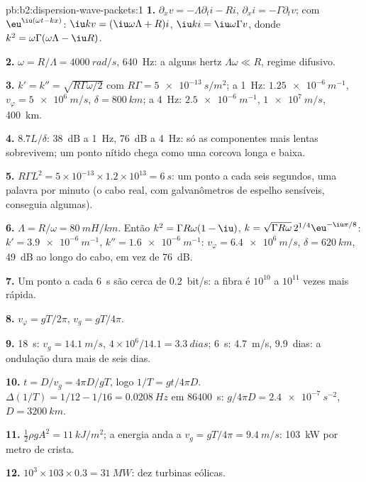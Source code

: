 \begin{solution}{pb:b2:dispersion-wave-packets:1}
\textbf{1.} $\partial_xv = -\Lambda\partial_ti - Ri$, $\partial_xi = -\Gamma\partial_tv$; com
$\eu^{\iu(\omega t - kx)}$: $\iu kv = (\iu\omega\Lambda + R)i$, $\iu ki = \iu\omega\Gamma v$, donde
$k^2 = \omega\Gamma(\omega\Lambda - \iu R)$.

\textbf{2.} $\omega = R/\Lambda = \qty{4000}{rad/s}$, \qty{640}{Hz}: a alguns hertz $\Lambda\omega
\ll R$, regime difusivo.

\textbf{3.} $k' = k'' = \sqrt{R\Gamma\omega/2}$ com $R\Gamma = \qty{5e-13}{s/m^2}$; a \qty{1}{Hz}:
$\qty{1.25e-6}{m^{-1}}$, $v_\varphi = \qty{5e6}{m/s}$, $\delta = \qty{800}{km}$; a \qty{4}{Hz}:
$\qty{2.5e-6}{m^{-1}}$, $\qty{1e7}{m/s}$, \qty{400}{km}.

\textbf{4.} $8.7L/\delta$: \qty{38}{dB} a \qty{1}{Hz}, \qty{76}{dB} a \qty{4}{Hz}: só as
componentes mais lentas sobrevivem; um ponto nítido chega como uma corcova longa e baixa.

\textbf{5.} $R\Gamma L^2 = 5 \times 10^{-13} \times 1.2 \times 10^{13} = \qty{6}{s}$: um ponto a cada
seis segundos, uma palavra por minuto (o cabo real, com galvanômetros
de espelho sensíveis, conseguia algumas).

\textbf{6.} $\Lambda = R/\omega = \qty{80}{mH/km}$. Então $k^2 = \Gamma R\omega(1 - \iu)$, $k = \sqrt{\Gamma R\omega}
\,2^{1/4}\eu^{-\iu\pi/8}$: $k' = \qty{3.9e-6}{m^{-1}}$, $k'' = \qty{1.6e-6}{m^{-1}}$: $v_\varphi =
\qty{6.4e6}{m/s}$, $\delta = \qty{620}{km}$, \qty{49}{dB} ao longo do cabo, em vez de
\qty{76}{dB}.

\textbf{7.} Um ponto a cada \qty{6}{s} são cerca de \qty{0.2}{bit/s}: a fibra é
$10^{10}$ a $10^{11}$ vezes mais rápida.

\textbf{8.} $v_\varphi = gT/2\pi$, $v_g = gT/4\pi$.

\textbf{9.} \qty{18}{s}: $v_g = \qty{14.1}{m/s}$, $4 \times 10^6/14.1 = \qty{3.3}{dias}$;
\qty{6}{s}: \qty{4.7}{m/s}, \qty{9.9}{dias}: a ondulação dura mais de seis dias.

\textbf{10.} $t = D/v_g = 4\pi D/gT$, logo $1/T = gt/4\pi D$. $\Delta(1/T) = 1/12 - 1/16
= \qty{0.0208}{Hz}$ em \qty{86400}{s}: $g/4\pi D = \qty{2.4e-7}{s^{-2}}$, $D = \qty{3200}{km}$.

\textbf{11.} $\tfrac12\rho gA^2 = \qty{11}{kJ/m^2}$; a energia anda a $v_g = gT/4\pi =
\qty{9.4}{m/s}$: \qty{103}{kW} por metro de crista.

\textbf{12.} $10^3 \times 103 \times 0.3 = \qty{31}{MW}$: dez turbinas eólicas.


\end{solution}
